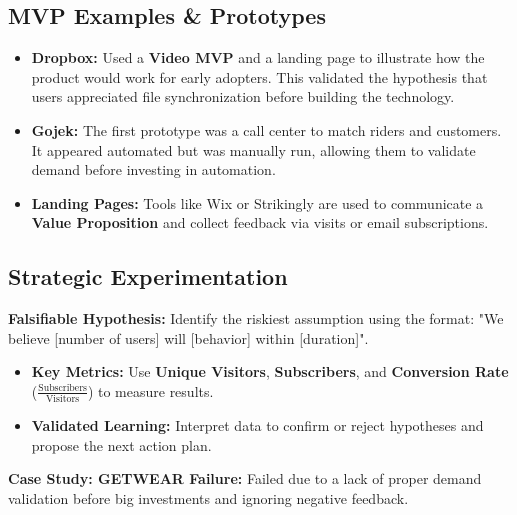 \subsection{MVP Examples \& Prototypes}
\begin{itemize}
    \item \textbf{Dropbox:} Used a \textbf{Video MVP} and a landing page to illustrate how the product would work for
          early adopters. This validated the hypothesis that users appreciated file
          synchronization before building the technology.
    \item \textbf{Gojek:} The first prototype was a call center to match riders and customers. It
          appeared automated but was manually run, allowing them to validate demand
          before investing in automation.
    \item \textbf{Landing Pages:} Tools like Wix or Strikingly are used to communicate a \textbf{Value Proposition} and collect feedback via visits or email subscriptions.
\end{itemize}

\subsection{Strategic Experimentation}
\textbf{Falsifiable Hypothesis:} Identify the riskiest assumption using the format: "We
believe [number of users] will [behavior] within [duration]".
\begin{itemize}
    \item \textbf{Key Metrics:} Use \textbf{Unique Visitors}, \textbf{Subscribers}, and \textbf{Conversion Rate} ($\frac{\text{Subscribers}}{\text{Visitors}}$) to measure
          results.
    \item \textbf{Validated Learning:} Interpret data to confirm or reject hypotheses and propose
          the next action plan.
\end{itemize}

\textbf{Case Study: GETWEAR Failure:} Failed due to a lack of proper demand validation
before big investments and ignoring negative feedback.